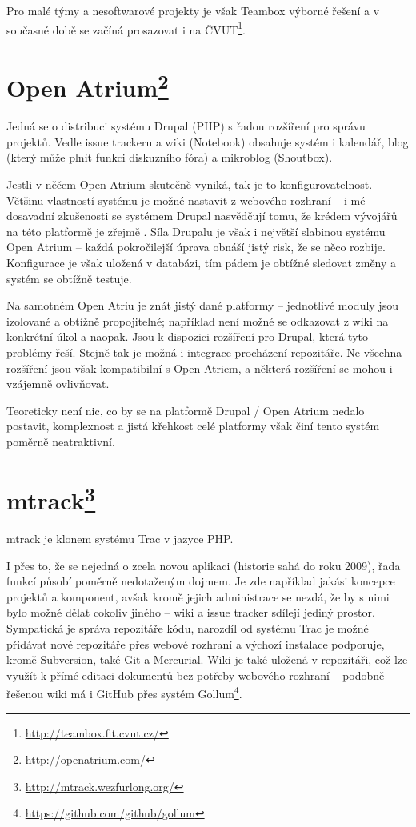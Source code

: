 \documentclass[thesis=B,czech]{FITthesis}[2012/05/02]
\begin{document}
Pro malé týmy a nesoftwarové projekty je však Teambox výborné řešení a v
současné době se začíná prosazovat i na ČVUT\footnote{\url{http://teambox.fit.cvut.cz/}}.

\section[Open Atrium]{Open Atrium\footnote{\url{http://openatrium.com/}}}

Jedná se o distribuci systému Drupal (PHP) s řadou rozšíření pro správu
projektů. Vedle issue trackeru a wiki (Notebook) obsahuje systém i
kalendář, blog (který může plnit funkci diskuzního fóra) a
\gls{mikroblog} (Shoutbox).

Jestli v něčem Open Atrium skutečně vyniká, tak je to
konfigurovatelnost. Většinu vlastností systému je možné nastavit z
webového rozhraní -- i mé dosavadní zkušenosti se systémem Drupal
nasvědčují tomu, že krédem vývojářů na této platformě je zřejmě
. Síla Drupalu je však i největší
slabinou systému Open Atrium -- každá pokročilejší úprava obnáší jistý
risk, že se něco rozbije. Konfigurace je však uložená v databázi, tím
pádem je obtížné sledovat změny a systém se obtížně testuje.

Na samotném Open Atriu je znát jistý  dané platformy --
jednotlivé moduly jsou izolované a obtížně propojitelné; například není
možné se odkazovat z wiki na konkrétní úkol a naopak. Jsou k dispozici
rozšíření pro Drupal, která tyto problémy řeší. Stejně tak je možná i
integrace procházení repozitáře. Ne všechna rozšíření jsou však
kompatibilní s Open Atriem, a některá rozšíření se mohou i vzájemně
ovlivňovat.

Teoreticky není nic, co by se na platformě Drupal / Open Atrium nedalo
postavit, komplexnost a jistá křehkost celé platformy však činí tento
systém poměrně neatraktivní.

\section[mtrack]{mtrack\footnote{\url{http://mtrack.wezfurlong.org/}}}

mtrack je klonem systému Trac v jazyce PHP.

I přes to, že se nejedná o zcela novou aplikaci (historie sahá do roku
2009), řada funkcí působí poměrně nedotaženým dojmem. Je zde například
jakási koncepce projektů a komponent, avšak kromě jejich administrace se
nezdá, že by s nimi bylo možné dělat cokoliv jiného -- wiki a issue
tracker sdílejí jediný prostor. Sympatická je správa repozitáře kódu,
narozdíl od systému Trac je možné přidávat nové repozitáře přes webové
rozhraní a výchozí instalace podporuje, kromě Subversion, také Git a
Mercurial. Wiki je také uložená v repozitáři, což lze využít k přímé
editaci dokumentů bez potřeby webového rozhraní -- podobně řešenou wiki
má i GitHub přes systém Gollum\footnote{\url{https://github.com/github/gollum}}.
\end{document}
